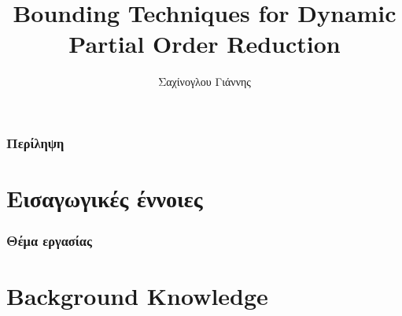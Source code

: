 \documentclass[9pt]{beamer}
\title[Short title]{Bounding Techniques for Dynamic Partial Order Reduction} %
\author{Σαχίνογλου Γιάννης} %
\institute[NTUA] %
{
ΣΗΜΜΥ - ΕΜΠ \\ %
\medskip
\textit{03112089} %
}
\date{} %
\begin{document}
\begin{frame}
\titlepage %
\end{frame}

\begin{frame}
\frametitle{Περίληψη} %
\tableofcontents %
\end{frame}


\section{Εισαγωγικές έννοιες} %


\begin{frame}
\frametitle{Θέμα εργασίας}

\end{frame}

\section{Background Knowledge}
\end{document}
